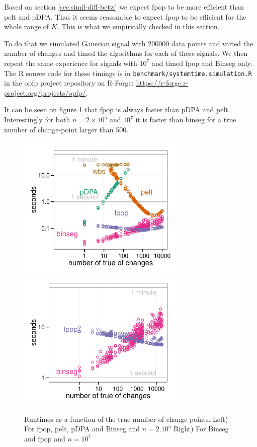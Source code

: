 \documentclass{article}
\begin{document}
Based on section \ref{sec:simil-diff-betw} we expect fpop to be more efficient than pelt and pDPA.
Thus it seems reasonable to expect fpop to be efficient for the whole range of $K$. 
This is what we empirically checked in this section.

To do that we simulated Gaussian signal with 200000 data points and varied the number of changes
and timed the algorithms for each of these signals. We then repeat the same experience for signals with $10^7$ and timed fpop and Binseg only.
The R source code
for these timings is in \verb|benchmark/systemtime.simulation.R| in
the opfp project repository on R-Forge: \url{https://r-forge.r-project.org/projects/opfp/}.

It can be seen on figure \ref{fig:simu_numberK} that fpop is always faster than pDPA and pelt. 
Interestingly for both $n=2\times 10^5$ and $10^7$ it is faster than binseg for a true number of change-point larger than 500.


\begin{figure}\label{fig:simu_numberK}
  \begin{center}
    \includegraphics[width=8cm]{figure-systemtime-simulation-small}
    \includegraphics[width=8cm]{figure-systemtime-simulationLarge-small}
  \end{center}
\caption{Runtimes as a function of the true number of change-points.
Left) For fpop, pelt,
pDPA and Binseg and $n=2. 10^5$
Right) For Binseg and fpop and $n=10^7$
}
\end{figure}
\end{document}
